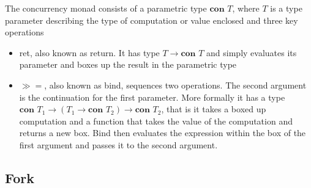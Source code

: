 \documentclass[12pt,twoside,notitlepage]{report}
\begin{document}
 The concurrency monad consists of a parametric type $  \textbf{con } T  $, where $ T $ is a type parameter describing the type of computation or value enclosed and three key operations 
\begin{itemize}
\item{ret, also known as return. It has type $ T \rightarrow \textbf{con }T   $ and simply evaluates its parameter and boxes up the result in the parametric type}
\item{$\gg=$, also known as bind, sequences two operations. The second argument is the continuation for the first parameter. More formally it has a type $ \textbf{con } T_1  \rightarrow ( T_1 \rightarrow \textbf{con } T_2 ) \rightarrow \textbf{con } T_2  $, that is it takes a boxed up computation and a function that takes the value of the computation and returns a new box. Bind then evaluates the expression within the box of the first argument and passes it to the second argument.}

\end{itemize}

\subsection{Fork}
\end{document}
